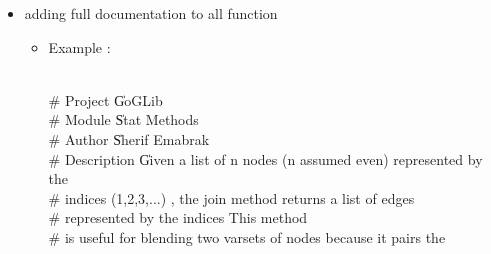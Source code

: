 \documentclass[12pt]{article}
\begin{document}
\lstset{language=Java}
\begin{itemize}
\item adding full documentation to all function
\begin{itemize}
\item Example : 

\\ \# Project     \| GoGLib
\\
\# Module  \hspace{2}    \| Stat\hspace{2} Methods
\\
\# Author  \hspace{2}    \| Sherif \hspace{2}Emabrak
\\
\# Description \hspace{2} \| Given\hspace{2} a\hspace{2} list\hspace{2} of \hspace{2}n\hspace{2} nodes \hspace{2}(n\hspace{2} assumed \hspace{2}even)\hspace{2} represented \hspace{2}by\hspace{2} the \\
\#    \hspace{70}indices\hspace{2}  (1,2,3,...) \hspace{2}, \hspace{2}the \hspace{2}join \hspace{2}method\hspace{2} returns\hspace{2} a \hspace{2}list \hspace{2}of \hspace{2}edges
\\
\# \hspace{70}               represented\hspace{2}  by \hspace{2}the\hspace{2} indices \hspace{2}{(1,1+n/2),(2,2+n/2),...}This \hspace{2} method
\\
\#  \hspace{70}is\hspace{2} useful\hspace{2} for\hspace{2} blending\hspace{2} two\hspace{2} varsets\hspace{2} of \hspace{2}nodes \hspace{2}because\hspace{2} it \hspace{2}pairs \hspace{2}the

\end{itemize}
\end{itemize}
\end{document}
